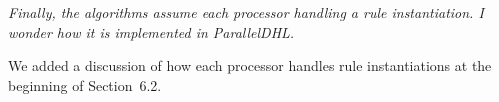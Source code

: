 \documentclass{article}
\let\quoteOld\quote
\let\endquoteOld\endquote
\renewenvironment{quote}{\quoteOld\itshape}{\endquoteOld}
\begin{document}
\begin{quote}
Finally, the algorithms assume each processor handling a rule instantiation. I wonder how it is implemented in ParallelDHL.
\end{quote}

We added a discussion of how each processor handles rule instantiations at the beginning of Section~6.2.










\end{document}

